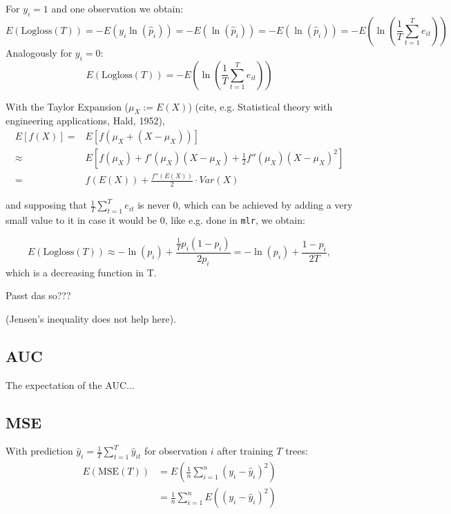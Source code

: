 \documentclass[paper=a4
               ,12pt
               ,DIV=12
               ,parskip=half
               ,titlepage=on
               ,headinclude 
               ,footinclude
               ,headsepline
               ,footsepline         %
               ,ilines 
               ]{scrartcl}
\begin{document}
For $y_i = 1$ and one observation we obtain: 
\begin{equation}
E(\text{Logloss}(T)) =  -E(y_i \ln(\hat{p}_i)) =  -E(\ln(\hat{p}_i)) = -E(\ln(\hat{p}_i)) = -E(\ln(\frac{1}{T} \sum_{t=1}^{T} e_{it} )) \nonumber
\end{equation}
Analogously for $y_i = 0$:
\begin{equation}
E(\text{Logloss}(T)) = -E(\ln(\frac{1}{T} \sum_{t=1}^{T} e_{it} )) \nonumber
\end{equation}

With the Taylor Expansion ($\mu_X := E(X)$) (cite, e.g. Statistical theory with engineering applications, Hald, 1952),
\begin{align}
E\left[f(X)\right]  {} = & E\left[f(\mu_X + \left(X - \mu_X\right))\right] \nonumber \\
\approx & E \left[f(\mu_X) + f'(\mu_X)\left(X-\mu_X\right) + \frac{1}{2}f''(\mu_X) \left(X - \mu_X\right)^2 \right] \nonumber \\
 = & f(E(X)) + \frac{f''(E(X))}{2} \cdot Var(X) \nonumber
\end{align}

and supposing that $\frac{1}{T} \sum_{t=1}^{T} e_{it}$ is never 0, which can 
be achieved by adding a very small value to it in case it would be 0, like e.g. done in \texttt{mlr}, we obtain:

\begin{equation}
E(\text{Logloss}(T)) \approx -\ln(p_i) + \frac{\frac{1}{T} p_i (1-p_i)}{2 p_i} = -\ln(p_i) + \frac{1-p_i}{2T}, \nonumber
\end{equation}
which is a decreasing function in T.

Passt das so???

(Jensen's inequality does not help here).

\subsection{AUC}

The expectation of the AUC...

\subsection{MSE}

With prediction $\hat{y}_{i} = \frac{1}{T} \sum_{t=1}^{T} \hat{y}_{it}$ for observation $i$ after training $T$ trees: 
\begin{align}
 E(\text{MSE}(T)) & = E(\frac{1}{n} \sum_{i=1}^{n} (y_i - \hat{y}_i) ^ 2) \nonumber \\
                  & = \frac{1}{n} \sum_{i=1}^{n} E((y_i - \hat{y}_i) ^ 2) \nonumber
\end{align}
\end{document}
